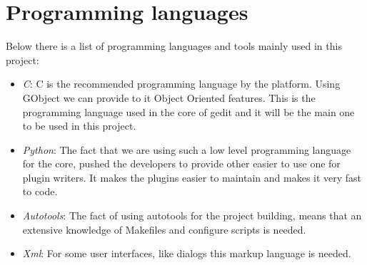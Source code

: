 \section{Programming languages}\label{sec:ProgrammingLanguages}

Below there is a list of programming languages and tools mainly used in this project:
\begin{itemize}
  \item \emph{C}: C is the recommended programming language by the platform. Using GObject we can provide to it Object Oriented features. This is the programming language used in the core of gedit and it will be the main one to be used in this project.
  \item \emph{Python}: The fact that we are using such a low level programming language for the core, pushed the developers to provide other easier to use one for plugin writers. It makes the plugins easier to maintain and makes it very fast to code.
  \item \emph{Autotools}: The fact of using autotools for the project building, means that an extensive knowledge of Makefiles and configure scripts is needed.
  \item \emph{Xml}: For some user interfaces, like dialogs this markup language is needed.
\end{itemize}
